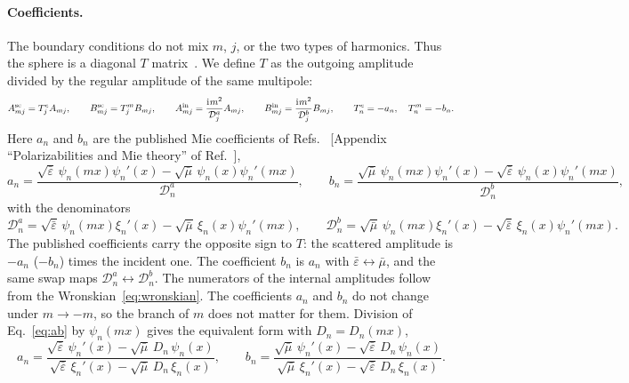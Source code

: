 \documentclass[
    pra,
    aps,
    reprint,
    onecolumn,
    amsmath,amssymb,
    a4paper,
    superscriptaddress,
    10pt,
    nofootinbib
]{revtex4-2}
\newcommand{\iu}{\mathrm{i}\mkern1mu}                 %
\newcommand{\eb}{\bar{\varepsilon}}
\newcommand{\mb}{\bar{\mu}}
\begin{document}
\paragraph{Coefficients.}
The boundary conditions do not mix $m$, $j$, or the two types of harmonics.
Thus the sphere is a diagonal $T$ matrix~\cite{Gouesbet2010OC,Thesis}.
We define $T$ as the outgoing amplitude divided by the regular amplitude of the same multipole:
\begin{equation}
    A^{\rm sc}_{mj} = T^e_j A_{mj}, \qquad
    B^{\rm sc}_{mj} = T^m_j B_{mj}, \qquad
    A^{\rm in}_{mj} = \frac{\iu m^2}{\mathcal{D}^a_j} A_{mj}, \qquad
    B^{\rm in}_{mj} = \frac{\iu m^2}{\mathcal{D}^b_j} B_{mj}, \qquad
    T^e_n = -a_n, \quad T^m_n = -b_n .
    \label{eq:Tmatrix}
\end{equation}
Here $a_n$ and $b_n$ are the published Mie coefficients of Refs.~\cite{Bohren1984,Thesis} [Appendix ``Polarizabilities and Mie theory'' of Ref.~\cite{Thesis}],
\begin{equation}
    a_n = \frac{\sqrt{\eb}\,\psi_n(mx)\psi_n'(x) - \sqrt{\mb}\,\psi_n(x)\psi_n'(mx)}{\mathcal{D}^a_n}, \qquad
    b_n = \frac{\sqrt{\mb}\,\psi_n(mx)\psi_n'(x) - \sqrt{\eb}\,\psi_n(x)\psi_n'(mx)}{\mathcal{D}^b_n},
    \label{eq:ab}
\end{equation}
with the denominators
\begin{equation}
    \mathcal{D}^a_n = \sqrt{\eb}\,\psi_n(mx)\xi_n'(x) - \sqrt{\mb}\,\xi_n(x)\psi_n'(mx), \qquad
    \mathcal{D}^b_n = \sqrt{\mb}\,\psi_n(mx)\xi_n'(x) - \sqrt{\eb}\,\xi_n(x)\psi_n'(mx) .
    \label{eq:Dab}
\end{equation}
The published coefficients carry the opposite sign to $T$: the scattered amplitude is $-a_n$ ($-b_n$) times the incident one.
The coefficient $b_n$ is $a_n$ with $\eb \leftrightarrow \mb$, and the same swap maps $\mathcal{D}^a_n \leftrightarrow \mathcal{D}^b_n$.
The numerators of the internal amplitudes follow from the Wronskian~\eqref{eq:wronskian}.
The coefficients $a_n$ and $b_n$ do not change under $m \to -m$, so the branch of $m$ does not matter for them.
Division of Eq.~\eqref{eq:ab} by $\psi_n(mx)$ gives the equivalent form with $D_n = D_n(mx)$,
\begin{equation}
    a_n = \frac{\sqrt{\eb}\,\psi_n'(x) - \sqrt{\mb}\, D_n\, \psi_n(x)}{\sqrt{\eb}\,\xi_n'(x) - \sqrt{\mb}\, D_n\, \xi_n(x)}, \qquad
    b_n = \frac{\sqrt{\mb}\,\psi_n'(x) - \sqrt{\eb}\, D_n\, \psi_n(x)}{\sqrt{\mb}\,\xi_n'(x) - \sqrt{\eb}\, D_n\, \xi_n(x)} .
    \label{eq:ab_D}
\end{equation}
\end{document}
